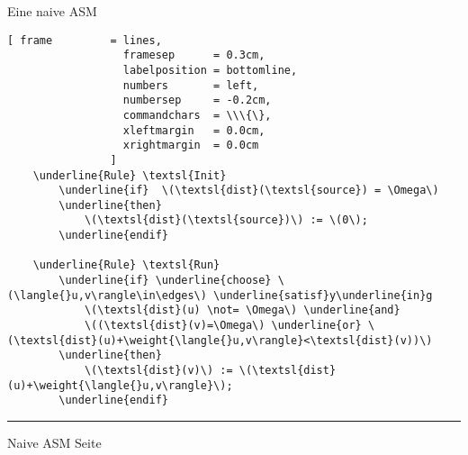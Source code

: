 \documentclass{slides}
\newcommand{\edges}{{\mathbb E}}
\newcommand{\weight}[1]{\|#1\|}
\newcounter{mypage}
\begin{document}
\begin{slide}{}
\normalsize

\begin{center}
 Eine naive ASM
\end{center}
\vspace*{0.5cm}

\footnotesize
\begin{Verbatim}[ frame         = lines, 
                  framesep      = 0.3cm, 
                  labelposition = bottomline,
                  numbers       = left,
                  numbersep     = -0.2cm,
                  commandchars  = \\\{\},
                  xleftmargin   = 0.0cm,
                  xrightmargin  = 0.0cm
                ]
    \underline{Rule} \textsl{Init}
        \underline{if}  \(\textsl{dist}(\textsl{source}) = \Omega\)
        \underline{then}
            \(\textsl{dist}(\textsl{source})\) := \(0\);
        \underline{endif}
        
    \underline{Rule} \textsl{Run}
        \underline{if} \underline{choose} \(\langle{}u,v\rangle\in\edges\) \underline{satisf}y\underline{in}g
            \(\textsl{dist}(u) \not= \Omega\) \underline{and}  
            \((\textsl{dist}(v)=\Omega\) \underline{or} \(\textsl{dist}(u)+\weight{\langle{}u,v\rangle}<\textsl{dist}(v))\)                 
        \underline{then}
            \(\textsl{dist}(v)\) := \(\textsl{dist}(u)+\weight{\langle{}u,v\rangle}\);
        \underline{endif}
\end{Verbatim}


\vspace*{\fill}
\tiny \addtocounter{mypage}{1}
\rule{17cm}{1mm}
Naive ASM \hspace*{\fill} Seite 
\end{slide}


\end{document}
